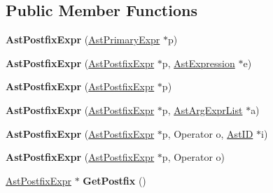 \subsection*{Public Member Functions}
\begin{DoxyCompactItemize}
\item 
\hypertarget{classAstPostfixExpr_a8299517f87239b0428545cdfc96f0bbc}{{\bfseries Ast\-Postfix\-Expr} (\hyperlink{classAstPrimaryExpr}{Ast\-Primary\-Expr} $\ast$p)}\label{classAstPostfixExpr_a8299517f87239b0428545cdfc96f0bbc}

\item 
\hypertarget{classAstPostfixExpr_a5dd762cbae8160f94a661ecdf3a90770}{{\bfseries Ast\-Postfix\-Expr} (\hyperlink{classAstPostfixExpr}{Ast\-Postfix\-Expr} $\ast$p, \hyperlink{classAstExpression}{Ast\-Expression} $\ast$e)}\label{classAstPostfixExpr_a5dd762cbae8160f94a661ecdf3a90770}

\item 
\hypertarget{classAstPostfixExpr_af17b325f38a7138728773d86a9342105}{{\bfseries Ast\-Postfix\-Expr} (\hyperlink{classAstPostfixExpr}{Ast\-Postfix\-Expr} $\ast$p)}\label{classAstPostfixExpr_af17b325f38a7138728773d86a9342105}

\item 
\hypertarget{classAstPostfixExpr_a4a1ae7a03b7b29e6641f47479e58aa3b}{{\bfseries Ast\-Postfix\-Expr} (\hyperlink{classAstPostfixExpr}{Ast\-Postfix\-Expr} $\ast$p, \hyperlink{classAstArgExprList}{Ast\-Arg\-Expr\-List} $\ast$a)}\label{classAstPostfixExpr_a4a1ae7a03b7b29e6641f47479e58aa3b}

\item 
\hypertarget{classAstPostfixExpr_a094735e6e2f593a42cc2b9aabc44213b}{{\bfseries Ast\-Postfix\-Expr} (\hyperlink{classAstPostfixExpr}{Ast\-Postfix\-Expr} $\ast$p, Operator o, \hyperlink{classAstID}{Ast\-I\-D} $\ast$i)}\label{classAstPostfixExpr_a094735e6e2f593a42cc2b9aabc44213b}

\item 
\hypertarget{classAstPostfixExpr_a71f3baa5264259031d95741e65de1e07}{{\bfseries Ast\-Postfix\-Expr} (\hyperlink{classAstPostfixExpr}{Ast\-Postfix\-Expr} $\ast$p, Operator o)}\label{classAstPostfixExpr_a71f3baa5264259031d95741e65de1e07}

\item 
\hypertarget{classAstPostfixExpr_a2cac2396d2ad13b9b9af3832aac846be}{\hyperlink{classAstPostfixExpr}{Ast\-Postfix\-Expr} $\ast$ {\bfseries Get\-Postfix} ()}\label{classAstPostfixExpr_a2cac2396d2ad13b9b9af3832aac846be}


\end{DoxyCompactItemize}
